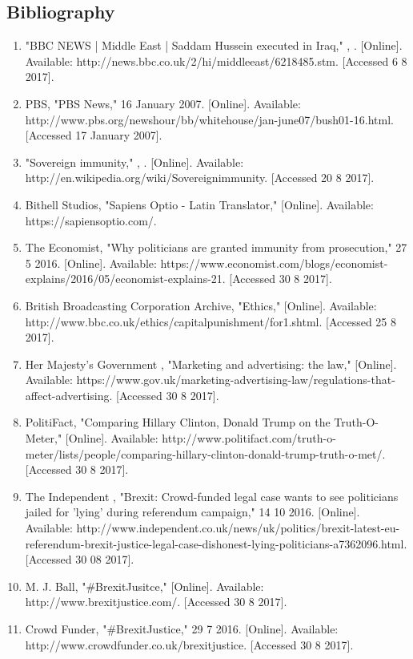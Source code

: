 \subsection{Bibliography}
\begin{enumerate}
	\item "BBC NEWS | Middle East | Saddam Hussein executed in Iraq," , . [Online]. Available: http://news.bbc.co.uk/2/hi/middle{\textunderscore}east/6218485.stm. [Accessed 6 8 2017].
	\item PBS, "PBS News," 16 January 2007. [Online]. Available: http://www.pbs.org/newshour/bb/white{\textunderscore}house/jan-june07/bush{\textunderscore}01-16.html. [Accessed 17 January 2007].
	\item "Sovereign immunity," , . [Online]. Available: http://en.wikipedia.org/wiki/Sovereign{\textunderscore}immunity. [Accessed 20 8 2017].
	\item Bithell Studios, "Sapiens Optio - Latin Translator," [Online]. Available: https://sapiensoptio.com/.
	\item The Economist, "Why politicians are granted immunity from prosecution," 27 5 2016. [Online]. Available: https://www.economist.com/blogs/economist-explains/2016/05/economist-explains-21. [Accessed 30 8 2017].
	\item British Broadcasting Corporation Archive, "Ethics," [Online]. Available: http://www.bbc.co.uk/ethics/capitalpunishment/for{\textunderscore}1.shtml. [Accessed 25 8 2017].
	\item Her Majesty's Government , "Marketing and advertising: the law," [Online]. Available: https://www.gov.uk/marketing-advertising-law/regulations-that-affect-advertising. [Accessed 30 8 2017].
	\item PolitiFact, "Comparing Hillary Clinton, Donald Trump on the Truth-O-Meter," [Online]. Available: http://www.politifact.com/truth-o-meter/lists/people/comparing-hillary-clinton-donald-trump-truth-o-met/. [Accessed 30 8 2017].
	\item The Independent , "Brexit: Crowd-funded legal case wants to see politicians jailed for 'lying' during referendum campaign," 14 10 2016. [Online]. Available: http://www.independent.co.uk/news/uk/politics/brexit-latest-eu-referendum-brexit-justice-legal-case-dishonest-lying-politicians-a7362096.html. [Accessed 30 08 2017].
	\item M. J. Ball, "{\#}BrexitJusitce," [Online]. Available: http://www.brexitjustice.com/. [Accessed 30 8 2017].
	\item Crowd Funder, "{\#}BrexitJustice," 29 7 2016. [Online]. Available: http://www.crowdfunder.co.uk/brexitjustice. [Accessed 30 8 2017].

\end{enumerate}
